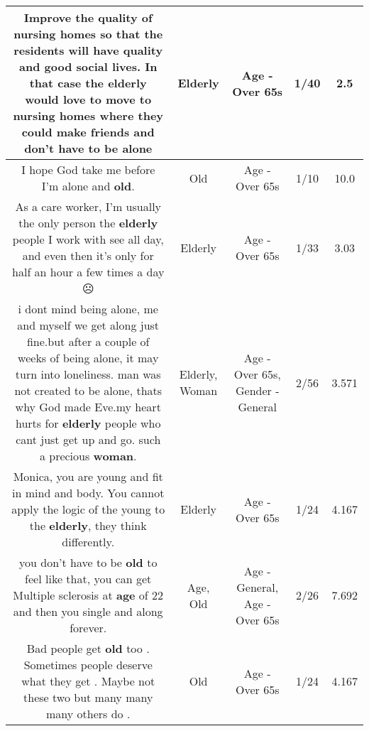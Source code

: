 \documentclass[11pt]{article}
\newlength\mylength
\begin{document}
\begin{center}
\begin{longtable}{|C{.65\mylength}|C{.30\mylength}|C{.12\mylength}|C{.12\mylength}|C{.12\mylength}|}
  \small Improve the quality of nursing homes so that the residents will have quality and good social lives. In that case the \textbf{elderly} would love to move to nursing homes where they could make friends and don't have to be alone\normalsize   & Elderly & Age - Over 65s & 1/40 & 2.5 \\  \hline
  \small I hope God take me before I'm alone and \textbf{old}.\normalsize   & Old & Age - Over 65s & 1/10 & 10.0 \\  \hline
  \small As a care worker, I'm usually the only person the \textbf{elderly} people I work with see all day, and even then it's only for half an hour a few times a day ☹️\normalsize   & Elderly & Age - Over 65s & 1/33 & 3.03 \\  \hline
  \small i dont mind being alone, me and myself we get along just fine.but after a couple of weeks of being alone, it may turn into loneliness.  man was not created to be alone, thats why God made Eve.my heart hurts for \textbf{elderly} people who cant just get up and go.  such a precious \textbf{woman}.\normalsize   & Elderly, Woman & Age - Over 65s, Gender - General & 2/56 & 3.571 \\  \hline
  \small Monica, you are young and fit in mind and body. You cannot apply the logic of the young to the \textbf{elderly}, they think differently.\normalsize   & Elderly & Age - Over 65s & 1/24 & 4.167 \\  \hline
  \small you don't have to be \textbf{old} to feel like that, you can get Multiple sclerosis at \textbf{age} of 22 and then you single and along forever.\normalsize   & Age, Old & Age - General, Age - Over 65s & 2/26 & 7.692 \\  \hline
  \small Bad people get \textbf{old} too . Sometimes people deserve what they get . Maybe not these two but many many many others do .\normalsize   & Old & Age - Over 65s & 1/24 & 4.167 \\  \hline

\end{longtable}
\end{center}
\end{document}
